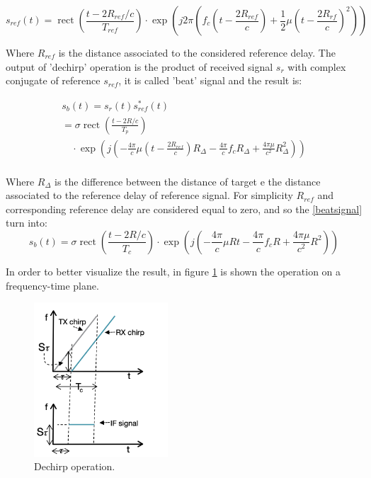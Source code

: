 \begin{equation}
s_{r e f}(t)=\operatorname{rect}\left(\frac{t-2 R_{r e f} / c}{T_{r e f}}\right) \cdot \exp \left(j 2 \pi\left(f_{c}\left(t-\frac{2 R_{r e f}}{c}\right)+\frac{1}{2} \mu\left(t-\frac{2 R_{r f}}{c}\right)^{2}\right)\right)
\end{equation}

Where $R_{r e f}$ is the distance associated to the considered reference delay.
The output of 'dechirp' operation is the product of received signal $s_{r}$ with complex conjugate of reference $s_{r e f}$, it is called 'beat' signal and the result is:

\begin{equation}
\begin{array}{l}
s_{b}(t)=s_{r}(t) s_{r e f}^{*}(t) \\
=\sigma \operatorname{rect}\left(\frac{t-2 R / c}{T_{p}}\right) \\
\quad \cdot \exp \left(j\left(-\frac{4 \pi}{c} \mu\left(t-\frac{2 R_{r ef}}{c}\right) R_{\Delta}-\frac{4 \pi}{c} f_{c} R_{\Delta}+\frac{4 \pi \mu}{c^{2}} R_{\Delta}^{2}\right)\right)
\end{array}
\label{beatsignal}
\end{equation}
\\
Where $R_{\Delta}$ is the difference between the distance of target e the distance associated to the reference delay of reference signal.
For simplicity $R_{r e f}$ and corresponding reference delay are considered equal to zero, and so the \ref{beatsignal} turn into:
\begin{equation}
s_{b}\left(t\right)=\sigma \operatorname{rect}\left(\frac{t-2 R / c}{T_{c}}\right) \cdot \exp \left(j\left(-\frac{4 \pi}{c} \mu R t-\frac{4 \pi}{c} f_{c} R+\frac{4 \pi \mu}{c^{2}} R^{2}\right)\right)
\label{finalbeat}
\end{equation}

In order to better visualize the result, in figure \ref{Dechirpfigure} is shown the operation on a frequency-time plane.

\begin{figure}[h!]
    \centering
    \includegraphics[width=5cm]{Time-frequency analysis-chap3/img/dechirp.png}
    \caption{Dechirp operation.}
    \label{Dechirpfigure}
\end{figure}


